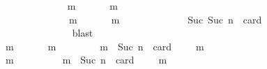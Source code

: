 \begin{isabellebody}
\ \ \ \ \ \ \ \ \ \ \ \ \isamarkupfalse%
\ {\isachardoublequoteopen}{\isasymexists}\ m\ {\isasymin}\ {\isasymsigma}\ {\isacharminus}\ {\isasymsigma}{\isacharprime}{\isachardot}\ {\isasymsigma}{\isacharprime}\ {\isasymunion}\ {\isacharbraceleft}m{\isacharbraceright}\ {\isasymin}\ {\isasymSigma}{\isachardoublequoteclose}\isanewline
\ \ \ \ \ \ \ \ \ \ \ \ \ \ \isamarkupfalse%
\ {\isacartoucheopen}{\isasymforall}\ {\isasymsigma}\ {\isasymin}\ {\isasymSigma}{\isachardot}\ {\isasymforall}\ {\isasymsigma}{\isacharprime}\ {\isasymin}\ {\isasymSigma}{\isachardot}\ {\isasymnot}\ {\isasymsigma}\ {\isasymsubseteq}\ {\isasymsigma}{\isacharprime}\ {\isasymlongrightarrow}\ {\isacharparenleft}{\isasymexists}\ m\ {\isasymin}\ {\isasymsigma}\ {\isacharminus}\ {\isasymsigma}{\isacharprime}{\isachardot}\ {\isasymsigma}{\isacharprime}\ {\isasymunion}\ {\isacharbraceleft}m{\isacharbraceright}\ {\isasymin}\ {\isasymSigma}{\isacharparenright}{\isacartoucheclose}\ {\isacartoucheopen}{\isasymsigma}\ {\isasymin}\ {\isasymSigma}{\isacartoucheclose}\ {\isacartoucheopen}{\isasymsigma}{\isacharprime}\ {\isasymin}\ {\isasymSigma}{\isacartoucheclose}\ {\isacartoucheopen}{\isasymnot}\ {\isasymsigma}\ {\isasymsubseteq}\ {\isasymsigma}{\isacharprime}\ {\isasymand}\ Suc\ {\isacharparenleft}Suc\ n{\isacharparenright}\ {\isacharequal}\ card\ {\isacharparenleft}{\isasymsigma}\ {\isacharminus}\ {\isasymsigma}{\isacharprime}{\isacharparenright}{\isacartoucheclose}\isanewline
\ \ \ \ \ \ \ \ \ \ \ \ \ \ \isamarkupfalse%
\ blast\isanewline
\ \ \ \ \ \ \ \ \ \ \ \ \isamarkupfalse%
\ \isamarkupfalse%
\ {\isachardoublequoteopen}{\isasymexists}\ m\ {\isasymin}\ {\isasymsigma}\ {\isacharminus}\ {\isasymsigma}{\isacharprime}{\isachardot}\ {\isasymsigma}{\isacharprime}\ {\isasymunion}\ {\isacharbraceleft}m{\isacharbraceright}\ {\isasymin}\ {\isasymSigma}\ {\isasymand}\ {\isasymnot}\ {\isasymsigma}\ {\isasymsubseteq}\ {\isasymsigma}{\isacharprime}\ {\isasymunion}\ {\isacharbraceleft}m{\isacharbraceright}\ {\isasymand}\ Suc\ n\ {\isacharequal}\ card\ {\isacharparenleft}{\isasymsigma}\ {\isacharminus}\ {\isacharparenleft}{\isasymsigma}{\isacharprime}\ {\isasymunion}\ {\isacharbraceleft}m{\isacharbraceright}{\isacharparenright}{\isacharparenright}{\isachardoublequoteclose}\isanewline
\ \ \ \ \ \ \ \ \ \ \ \ \ \ \isamarkupfalse%
\ {\isacartoucheopen}{\isasymforall}\ m\ {\isasymin}\ {\isasymsigma}\ {\isacharminus}\ {\isasymsigma}{\isacharprime}{\isachardot}\ {\isasymnot}\ {\isasymsigma}\ {\isasymsubseteq}\ {\isasymsigma}{\isacharprime}\ {\isasymunion}\ {\isacharbraceleft}m{\isacharbraceright}\ {\isasymand}\ Suc\ n\ {\isacharequal}\ card\ {\isacharparenleft}{\isasymsigma}\ {\isacharminus}\ {\isacharparenleft}{\isasymsigma}{\isacharprime}\ {\isasymunion}\ {\isacharbraceleft}m{\isacharbraceright}{\isacharparenright}{\isacharparenright}{\isacartoucheclose}\ \isanewline

\end{isabellebody}
